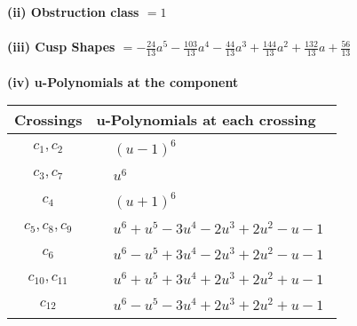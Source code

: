 \documentclass[1p]{elsarticle_modified}
\theoremstyle{definition}
\begin{document}
\flushleft \textbf{(ii) Obstruction class $= 1$}\\~\\
\flushleft \textbf{(iii) Cusp Shapes $= -\frac{24}{13} a^5-\frac{103}{13} a^4-\frac{44}{13} a^3+\frac{144}{13} a^2+\frac{132}{13} a+\frac{56}{13}$}\\~\\
\newpage\renewcommand{\arraystretch}{1}
\flushleft \textbf{(iv) u-Polynomials at the component}\newline \\
\begin{tabular}{m{50pt}|m{274pt}}
Crossings & \hspace{64pt}u-Polynomials at each crossing \\
\hline $$\begin{aligned}c_{1},c_{2}\end{aligned}$$&$\begin{aligned}
&(u-1)^6
\end{aligned}$\\
\hline $$\begin{aligned}c_{3},c_{7}\end{aligned}$$&$\begin{aligned}
&u^6
\end{aligned}$\\
\hline $$\begin{aligned}c_{4}\end{aligned}$$&$\begin{aligned}
&(u+1)^6
\end{aligned}$\\
\hline $$\begin{aligned}c_{5},c_{8},c_{9}\end{aligned}$$&$\begin{aligned}
&u^6+u^5-3 u^4-2 u^3+2 u^2- u-1
\end{aligned}$\\
\hline $$\begin{aligned}c_{6}\end{aligned}$$&$\begin{aligned}
&u^6- u^5+3 u^4-2 u^3+2 u^2- u-1
\end{aligned}$\\
\hline $$\begin{aligned}c_{10},c_{11}\end{aligned}$$&$\begin{aligned}
&u^6+u^5+3 u^4+2 u^3+2 u^2+u-1
\end{aligned}$\\
\hline $$\begin{aligned}c_{12}\end{aligned}$$&$\begin{aligned}
&u^6- u^5-3 u^4+2 u^3+2 u^2+u-1
\end{aligned}$\\
\hline
\end{tabular}\\~\\
\end{document}
